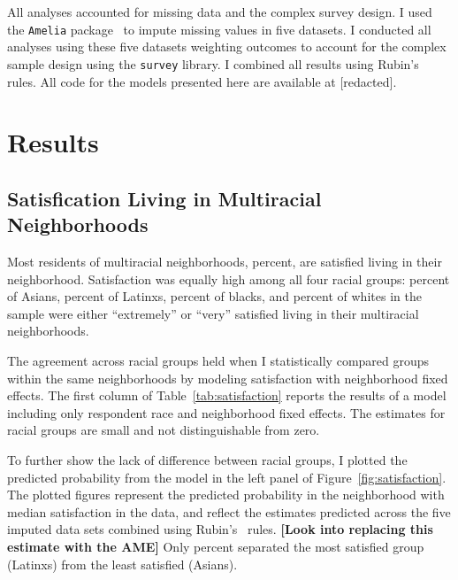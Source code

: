\documentclass{baderart}
\begin{document}
All analyses accounted for missing data and the complex survey design. I used the \texttt{Amelia} package~\citep{honaker_amelia_2011} to impute missing values in five datasets. I conducted all analyses using these five datasets weighting outcomes to account for the complex sample design using the \texttt{survey} library. I combined all results using Rubin's~\citeyearpar{rubin_multiple_2004} rules. All code for the models presented here are available at [redacted].

\section{Results}\label{results}

\subsection{Satisfication Living in Multiracial Neighborhoods}\label{satisfication-living-in-multiracial-neighborhoods}

Most residents of multiracial neighborhoods, \meansatisfied percent, are satisfied living in their neighborhood. Satisfaction was equally high among all four racial groups: \apisatisfied percent of Asians, \hspsatisfied percent of Latinxs, \nhbsatisfied percent of blacks, and \nhwsatisfied percent of whites in the sample were either ``extremely'' or ``very'' satisfied living in their multiracial neighborhoods.

The agreement across racial groups held when I statistically compared groups within the same neighborhoods by modeling satisfaction with neighborhood fixed effects. The first column of Table~\ref{tab:satisfaction} reports the results of a model including only respondent race and neighborhood fixed effects. The estimates for racial groups are small and not distinguishable from zero.



To further show the lack of difference between racial groups, I plotted the predicted probability from the model in the left panel of Figure~\ref{fig:satisfaction}. The plotted figures represent the predicted probability in the neighborhood with median satisfaction in the data, and reflect the estimates predicted across the five imputed data sets combined using Rubin's~\citep{rubin_multiple_2004} rules. \textbf{{[}Look into replacing this estimate with the AME{]}} Only \maxdiffone percent separated the most satisfied group (Latinxs) from the least satisfied (Asians).
\end{document}
